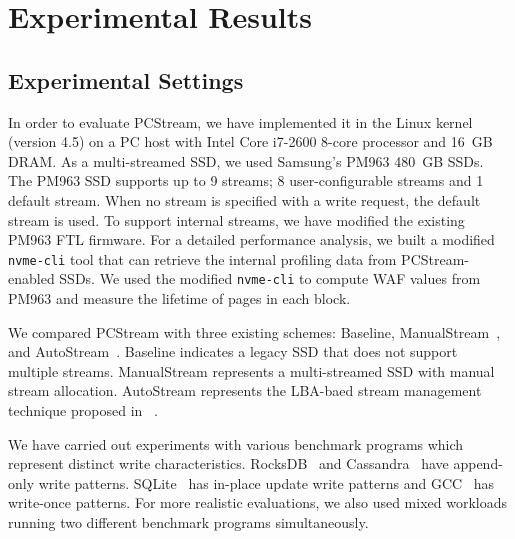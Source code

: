 \vspace{-10pt}
\section{Experimental Results}
\vspace{-5pt}
\subsection{Experimental Settings}
\vspace{-5pt}
In order to evaluate \textsf{\small PCStream}, we have implemented it in the
Linux kernel (version 4.5) on a PC host with Intel Core i7-2600 8-core
processor and 16~GB DRAM.  As a multi-streamed SSD, we used Samsung's PM963
480~GB SSDs.  The PM963 SSD supports up to 9 streams; 8 user-configurable
streams and 1 default stream.  When no stream is specified with a write
request, the default stream is used.  To support internal streams, we have
modified the existing PM963 FTL firmware.  For a detailed performance analysis,
we built a modified {\tt nvme-cli} tool that can retrieve the internal
profiling data from PCStream-enabled SSDs.  We used the modified {\tt nvme-cli}
to compute WAF values from PM963 and measure the lifetime of pages in each
block. 

We compared \textsf{\small PCStream} with three existing schemes:
\textsf{\small Baseline}, \textsf{\small ManualStream}~\cite{MultiStream}, and
\textsf{\small AutoStream}~\cite{AutoStream}.  \textsf{\small Baseline}
indicates a legacy SSD that does not support multiple streams. \textsf{\small
ManualStream} represents a multi-streamed SSD with manual stream allocation.
\textsf{\small AutoStream} represents the LBA-baed stream management technique
proposed in ~\cite{AutoStream}. 


We have carried out experiments with various benchmark programs
which represent distinct write characteristics.
RocksDB~\cite{RocksDB} and Cassandra~\cite{Cassandra} have
append-only write patterns. SQLite~\cite{SQLite} has in-place update write patterns
and GCC~\cite{GCC} has write-once patterns.  
For more realistic evaluations, we also used mixed workloads running two 
different benchmark programs simultaneously.

